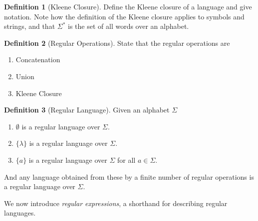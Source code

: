 \documentclass[12 pt, twoside, letterpaper]{article}
\newcommand{\note}[1]{\textit{\color{blue}{#1}}}
\theoremstyle{definition}
\newtheorem{definition}{Definition}
\theoremstyle{remark}
\theoremstyle{plain}
\begin{document}
	\iffalse
	\begin{definition}[Positive Closure]
		Define the positive closure of a set and give notation. 
		Also give notation and meaning for the set of nonempty words over an alphabet.
		\note{I'm not sure I actually need to include this.}
	\end{definition}
	\fi

	\begin{definition}[Kleene Closure]
		Define the Kleene closure of a language and give notation.
		Note how the definition of the Kleene closure applies to symbols and strings, and that $\Sigma^*$ is the set of all words over an alphabet.
	\end{definition}

	\begin{definition}[Regular Operations]
		State that the regular operations are 
		\begin{enumerate}[label=(\roman*), itemsep = -0.3 ex]
			\item Concatenation
			\item Union
			\item Kleene Closure
		\end{enumerate}
	\end{definition}

	\begin{definition}[Regular Language]
		Given an alphabet $\Sigma$
		\begin{enumerate}[label=(\roman*), itemsep = -0.3 ex]
			\item $\emptyset$ is a regular language over $\Sigma$.
			\item $\{ \lambda \}$ is a regular language over $\Sigma$.
			\item $\{ a \}$ is a regular language over $\Sigma$ for all $a \in \Sigma$.
		\end{enumerate}
		And any language obtained from these by a finite number of regular operations is a regular language over $\Sigma$.
	\end{definition}

	We now introduce \textit{regular expressions}, a shorthand for describing regular languages.
\end{document}
